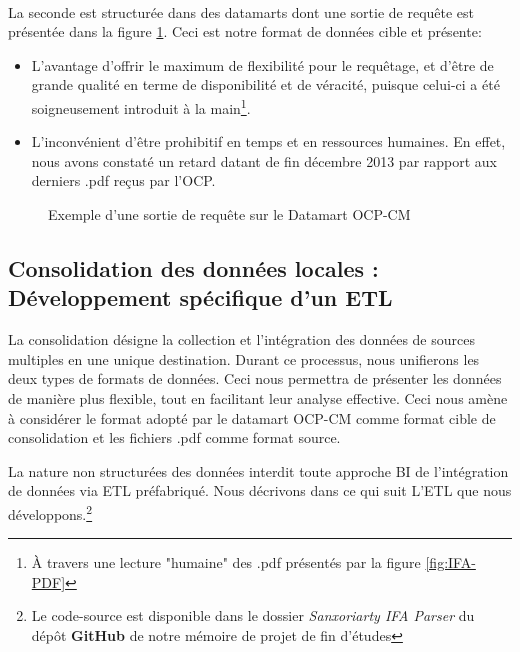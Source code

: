 		\paragraph{}
		La seconde est structurée dans des datamarts dont une sortie de requête est présentée dans la figure \ref{fig:DMOCP}.
	Ceci est notre format de données cible 
	et présente:
	\begin{itemize}
	\item L'avantage d’offrir le maximum de flexibilité pour le requêtage, et d'être de grande qualité en terme de disponibilité et de véracité, puisque celui-ci a été soigneusement introduit à la main\footnote{À travers une lecture "humaine" des .pdf présentés par la figure \ref{fig:IFA-PDF}}.
	\item L’inconvénient d'être prohibitif en temps et en ressources humaines.
	 En effet, nous avons constaté un retard datant de fin décembre 2013 par rapport aux derniers .pdf reçus par l'OCP.
	\end{itemize}
	\begin{figure}[H]
		    		\centering
		    		\caption{Exemple d'une sortie de requête sur le Datamart OCP-CM}
		    		\label{fig:DMOCP}
	\end{figure}
	\subsection{Consolidation des données locales : Développement spécifique d'un ETL}
	La consolidation désigne la collection et l'intégration des données de sources multiples en une unique destination. Durant ce processus, nous unifierons les deux types de formats de données. Ceci nous permettra de présenter les données de manière plus flexible, tout en facilitant leur analyse effective. Ceci nous amène à considérer le format adopté par le datamart OCP-CM comme format cible de consolidation et les fichiers .pdf comme format source.
	\par
	La nature non structurées des données interdit toute approche BI de l'intégration de données via ETL préfabriqué. Nous décrivons dans ce qui suit L'ETL que nous développons.\footnote{Le code-source est disponible dans le dossier \textit{Sanxoriarty IFA Parser} du dépôt \textbf{GitHub} de notre mémoire de projet de fin d'études\cite{this}}
